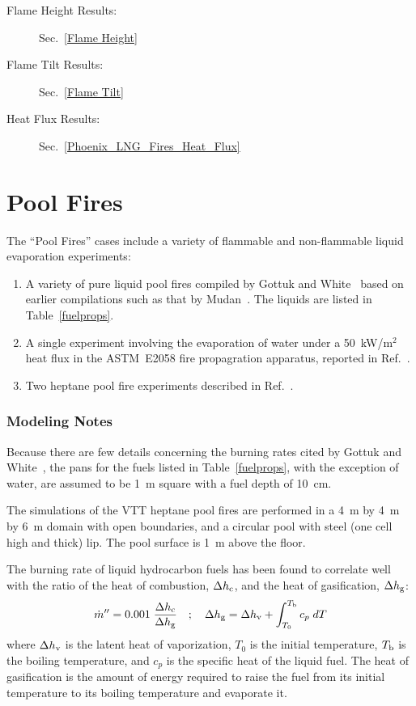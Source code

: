 \begin{description}
\item[Flame Height Results:] Sec.~\ref{Flame Height}
\item[Flame Tilt Results:] Sec.~\ref{Flame Tilt}
\item[Heat Flux Results:] Sec.~\ref{Phoenix_LNG_Fires_Heat_Flux}
\end{description}

\FloatBarrier

\section{Pool Fires}
\label{Pool_Fires_Description}

The ``Pool Fires'' cases include a variety of flammable and non-flammable liquid evaporation experiments:
\begin{enumerate}
\item A variety of pure liquid pool fires compiled by Gottuk and White~\cite{SFPE:Gottuk_and_White} based on earlier compilations such as that by Mudan~\cite{Mudan:1984}. The liquids are listed in Table~\ref{fuelprops}.
\item A single experiment involving the evaporation of water under a 50~kW/m$^2$ heat flux in the ASTM~E2058 fire propagration apparatus, reported in Ref.~\cite{SFPE:Tewarson}.
\item Two heptane pool fire experiments described in Ref.~\cite{Sikanen:2016}.
\end{enumerate}

\subsubsection{Modeling Notes}

Because there are few details concerning the burning rates cited by Gottuk and White~\cite{SFPE:Gottuk_and_White}, the pans for the fuels listed in Table~\ref{fuelprops}, with the exception of water, are assumed to be 1~m square with a fuel depth of 10~cm.

The simulations of the VTT heptane pool fires are performed in a 4~m by 4~m by 6~m domain with open boundaries, and a circular pool with steel (one cell high and thick) lip. The pool surface is 1~m above the floor.

The burning rate of liquid hydrocarbon fuels has been found to correlate well with the ratio of the heat of combustion, $\Delta h_{\rm c}$, and the heat of gasification, $\Delta h_{\rm g}$:
\begin{equation}
\dot{m}''= 0.001 \; \frac{\Delta h_{\rm c}}{\Delta h_{\rm g}} \quad ; \quad \Delta h_{\rm g} = \Delta h_{\rm v} + \int_{T_0}^{T_{\rm b}} c_p \; dT
\label{poolcorr}
\end{equation}
where $\Delta h_{\rm v}$ is the latent heat of vaporization, $T_0$ is the initial temperature, $T_{\rm b}$ is the boiling temperature, and $c_p$ is the specific heat of the liquid fuel. The heat of gasification is the amount of energy required to raise the fuel from its initial temperature to its boiling temperature and evaporate it.


